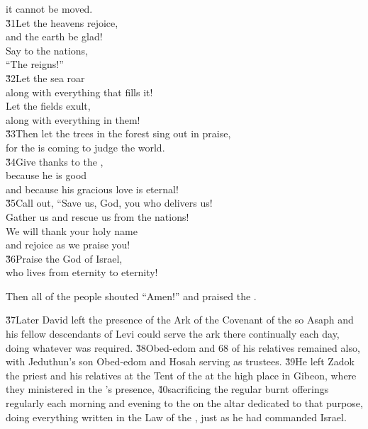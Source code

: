 \begin{poetry}
\poemlll       it cannot be moved. \\
\poeml \v{31}Let the heavens rejoice, \\
\poemll    and the earth be glad! \\
\poeml Say to the nations, \\
\poemll    ``The  reigns!'' \\
\poeml \v{32}Let the sea roar \\
\poemll    along with everything that fills it! \\
\poeml Let the fields exult, \\
\poemll    along with everything in them! \\
\poeml \v{33}Then let the trees in the forest sing out in praise, \\
\poemll    for the  is coming to judge the world. \\
\poeml \v{34}Give thanks to the , \\
\poemll    because he is good \\
\poemlll       and because his gracious love is eternal! \\
\poeml \v{35}Call out, ``Save us, God, you who delivers us! \\
\poemll    Gather us and rescue us from the nations! \\
\poeml We will thank your holy name \\
\poemll    and rejoice as we praise you! \\
\poeml \v{36}Praise the  God of Israel, \\
\poemll    who lives from eternity to eternity!
\end{poetry}

Then all of the people shouted ``Amen!'' and praised the .

\v{37}Later David left the presence of the Ark of the Covenant of the  so Asaph and his fellow descendants of Levi could serve the ark there continually each day, doing whatever was required. \v{38}Obed-edom and 68 of his relatives remained also, with Jeduthun's son Obed-edom and Hosah serving as trustees. \v{39}He left Zadok the priest and his relatives at the Tent of the  at the high place in Gibeon, where they ministered in the 's presence, \v{40}sacrificing the regular burnt offerings regularly each morning and evening to the  on the altar dedicated to that purpose, doing everything written in the Law of the , just as he had commanded Israel.

